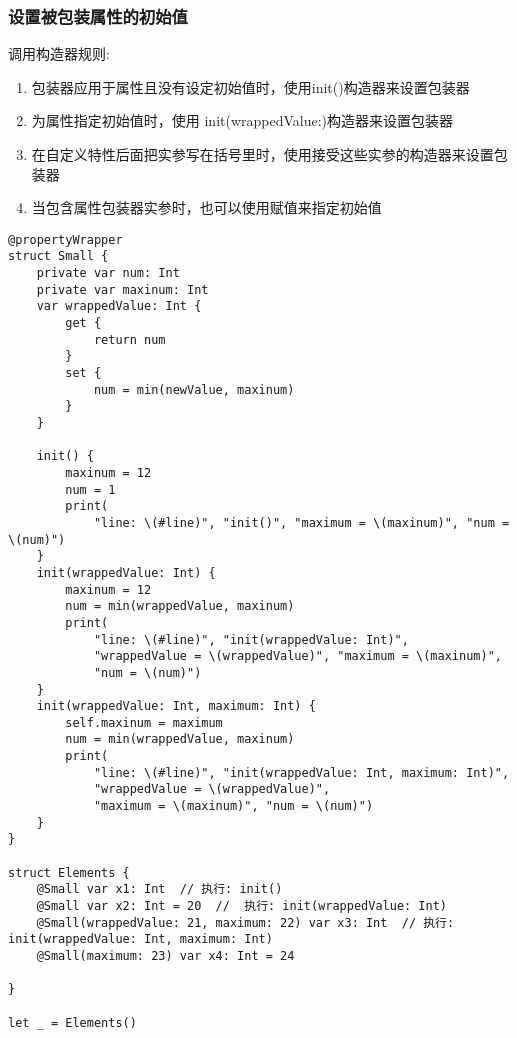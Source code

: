 \documentclass{../main.tex}{subfiles}
\begin{document}
\subsubsection{设置被包装属性的初始值}
调用构造器规则:
\begin{enumerate}[itemsep=0pt, parsep=0pt, topsep=0pt, partopsep=0pt]
    \item 包装器应用于属性且没有设定初始值时，使用init()构造器来设置包装器
    \item 为属性指定初始值时，使用 init(wrappedValue:)构造器来设置包装器
    \item 在自定义特性后面把实参写在括号里时，使用接受这些实参的构造器来设置包装器
    \item 当包含属性包装器实参时，也可以使用赋值来指定初始值
\end{enumerate}

\begin{lstlisting}[style = CodeLstStyleSwift, caption = {属性包装器设置被包装属性初始值}]
@propertyWrapper
struct Small {
    private var num: Int
    private var maxinum: Int
    var wrappedValue: Int {
        get {
            return num
        }
        set {
            num = min(newValue, maxinum)
        }
    }

    init() {
        maxinum = 12
        num = 1
        print(
            "line: \(#line)", "init()", "maximum = \(maxinum)", "num = \(num)")
    }
    init(wrappedValue: Int) {
        maxinum = 12
        num = min(wrappedValue, maxinum)
        print(
            "line: \(#line)", "init(wrappedValue: Int)",
            "wrappedValue = \(wrappedValue)", "maximum = \(maxinum)",
            "num = \(num)")
    }
    init(wrappedValue: Int, maximum: Int) {
        self.maxinum = maximum
        num = min(wrappedValue, maxinum)
        print(
            "line: \(#line)", "init(wrappedValue: Int, maximum: Int)",
            "wrappedValue = \(wrappedValue)",
            "maximum = \(maxinum)", "num = \(num)")
    }
}

struct Elements {
    @Small var x1: Int  // 执行: init()
    @Small var x2: Int = 20  //  执行: init(wrappedValue: Int)
    @Small(wrappedValue: 21, maximum: 22) var x3: Int  // 执行: init(wrappedValue: Int, maximum: Int)
    @Small(maximum: 23) var x4: Int = 24

}

let _ = Elements()

\end{lstlisting}
\end{document}
